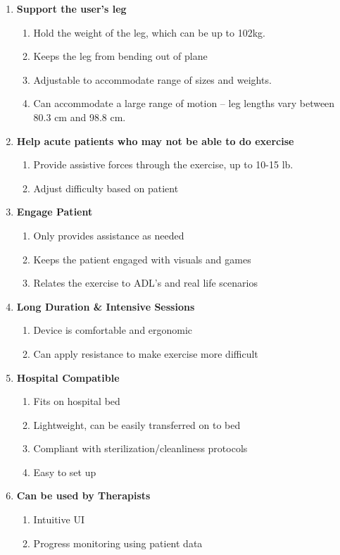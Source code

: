 \documentclass[12pt]{report}
\begin{document}
\begin{enumerate}[label*=\arabic*.]
	\item \textbf{Support the user's leg}
	\begin{enumerate}[label*=\arabic*.]
		\item Hold the weight of the leg, which can be up to 102kg. 
		\item Keeps the leg from bending out of plane 
		\item Adjustable to accommodate range of sizes and weights. 
		\item Can accommodate a large range of motion -- leg lengths vary between 80.3 cm and 98.8 cm.
	\end{enumerate}
	\item \textbf{Help acute patients who may not be able to do exercise}
	\begin{enumerate}[label*=\arabic*.]
		\item Provide assistive forces through the exercise, up to 10-15 lb. 
		\item Adjust difficulty based on patient 
	\end{enumerate}
	\item \textbf{Engage Patient}
	\begin{enumerate}[label*=\arabic*.]
		\item Only provides assistance as needed
		\item Keeps the patient engaged with visuals and games
		\item Relates the exercise to ADL's and real life scenarios
	\end{enumerate}
	\item \textbf{Long Duration \& Intensive Sessions}
	\begin{enumerate}[label*=\arabic*.]
		\item Device is comfortable and ergonomic
		\item Can apply resistance to make exercise more difficult
	\end{enumerate}
	\item \textbf{Hospital Compatible}
	\begin{enumerate}[label*=\arabic*.]
		\item Fits on hospital bed 
		\item Lightweight, can be easily transferred on to bed
		\item Compliant with sterilization/cleanliness protocols 
		\item Easy to set up 
	\end{enumerate}
	\item \textbf{Can be used by Therapists}
	\begin{enumerate}[label*=\arabic*.]
		\item Intuitive UI
		\item Progress monitoring using patient data
	\end{enumerate}

\end{enumerate}			
\end{document}
